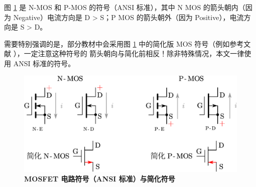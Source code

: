 \documentclass[UTF8]{report}
\theoremstyle{MyLineTheoremStyle} %
\theoremstyle{MyBlockTheoremStyle} %
\theoremstyle{MySubsubsectionStyle} %
\begin{document}
%    
%        


\begin{center}\noindent\begin{minipage}{0.41\columnwidth}
    \hspace*{2em} 图 \ref{} 是 N-MOS 和 P-MOS 的符号（ANSI 标准），其中 N MOS 的箭头朝内（因为 Negative）电流方向是 D > S；P MOS 的箭头朝外（因为 Positive），电流方向是 S > D。

    \hspace*{2em} 需要特别强调的是，部分教材中会采用图 \ref{} 中的简化版 MOS 符号（例如参考文献 \cite{电路原理} \cite{电路原理导学导教}），一定注意这种符号的 {\color{red} 箭头朝向与简化前相反}！除非特殊情况，本文一律使用 ANSI 标准的符号。
\end{minipage}\hfill\begin{minipage}{0.53\columnwidth}
    \begin{figure}[H]\centering
        \includegraphics[width=\columnwidth]{assets/2/MOS管大全.pdf}
        \caption{\bfseries MOSFET 电路符号（ANSI 标准）与简化符号 }\label{}
    \end{figure}
\end{minipage}\end{center}
\end{document}
